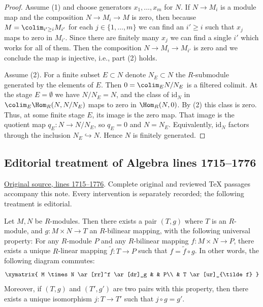 \begin{proof}
Assume (1) and choose generators $x_1, \ldots, x_m$ for $N$.
If $N \to M_i$ is a module map and the composition
$N \to M_i \to M$ is zero, then because $M = \colim_{i' \geq i} M_{i'}$
for each $j \in \{1, \ldots, m\}$ we can find an $i' \geq i$ such that
$x_j$ maps to zero in $M_{i'}$. Since there are finitely many
$x_j$ we can find a single $i'$ which works for all of them.
Then the composition $N \to M_i \to M_{i'}$ is zero and we conclude
the map is injective, i.e., part (2) holds.

\medskip\noindent
Assume (2). For a finite subset $E \subset N$ denote $N_E \subset N$
the $R$-submodule generated by the elements of $E$. Then
$0 = \colim_E N/N_E$ is a filtered colimit. At the stage
$E = \emptyset$ we have $N/N_E = N$, and the class of
$\mathrm{id}_N$ in $\colim_E\Hom_R(N, N/N_E)$ maps to zero in
$\Hom_R(N, 0)$. By (2) this class is zero. Thus, at some finite
stage $E$, its image is the zero map. That image is the quotient
map $q_E : N \to N/N_E$, so $q_E = 0$ and $N = N_E$.
Equivalently, $\mathrm{id}_N$ factors through the inclusion
$N_E \hookrightarrow N$. Hence $N$ is finitely generated.
\end{proof}


\subsection{Editorial treatment of Algebra lines 1715--1776}

\hypertarget{algebra-context-005}{}

\noindent\href{https://github.com/stacks/stacks-project/blob/a04446e57ec1fbc252a871afcec7752fb2807b14/algebra.tex\#L1715}{Original source, lines 1715--1776}. Complete original and reviewed TeX passages accompany this note. Every intervention is separately recorded; the following treatment is editorial.


\begin{lemma}
\label{editorial-source-lemma-tensor-product}
Let $M, N$ be $R$-modules. Then there exists a pair $(T, g)$
where $T$ is an $R$-module, and
$g : M \times N \to T$ an $R$-bilinear
mapping, with the following universal property:
For any $R$-module $P$ and any $R$-bilinear mapping
$f : M \times N \to P$, there
exists a unique $R$-linear
mapping $\tilde{f} : T \to P$ such that $f = \tilde{f} \circ g$.
In other words, the following diagram commutes:
$$
\xymatrix{
M \times N \ar[rr]^f \ar[dr]_g & & P\\
& T \ar[ur]_{\tilde f}
}
$$
Moreover, if $(T, g)$ and $(T', g')$
are two pairs with this property, then there
exists a unique isomorphism
$j : T \to T'$ such that $j\circ g = g'$.
\end{lemma}

